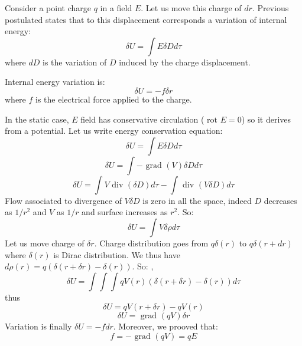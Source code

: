 \documentclass[12pt]{book}
\begin{document}
Consider a point charge $q$ in a field $E$. Let us move this charge of
$dr$. Previous postulated states that to this displacement corresponds a
variation of internal energy:
\begin{equation}
\delta U=\int E\delta D d\tau
\end{equation}
where $dD$ is the variation of $D$ induced by the charge displacement.
\begin{thm}
Internal energy variation is:
\begin{equation}
\delta U=-f \delta r
\end{equation}
where $f$ is the electrical force applied to the charge.
\end{thm}
\begin{pf}
In the static case, $E$ field has conservative circulation ($\mbox{ rot }
E=0$) so it derives from a potential.
\medskip
Let us write energy conservation equation:
\begin{equation}
\delta U=\int E\delta D  d\tau
\end{equation}
\begin{equation}
\delta U=\int- \mbox{ grad } (V) \delta D  d\tau
\end{equation}
\begin{equation}
\delta U=\int V \mbox{ div }(\delta D)  d\tau-\int \mbox{ div }(V\delta D)  d\tau
\end{equation}
Flow associated to divergence of $V\delta D$ is zero in all the space, indeed
$D$ decreases as $1/r^2$ and $V$ as $1/r$ and surface increases as $r^2$. So:
\begin{equation}
\delta U=\int V \delta \rho  d\tau
\end{equation}
Let us move charge of $\delta r$. Charge distribution goes from $q\delta(r)$
to $q\delta(r+dr)$ where 
$\delta(r)$ is Dirac distribution. We thus have $d
\rho(r)=q(\delta(r+\delta r)-\delta(r))$. So:
,\begin{equation}
\delta U=\int\!\!\!\int\!\!\!\int qV(r)(\delta(r+\delta r)-\delta(r))  d\tau
\end{equation}
thus
\begin{equation}
\delta U=qV(r+\delta r)-qV(r)
\end{equation}
\begin{equation}
\delta U=\mbox{ grad }(qV)\delta r
\end{equation}
Variation is finally $\delta U=-fdr$. Moreover, we prooved that:
\begin{equation}
f=-\mbox{ grad }(qV)=qE
\end{equation}    
\end{pf}
\end{document}
